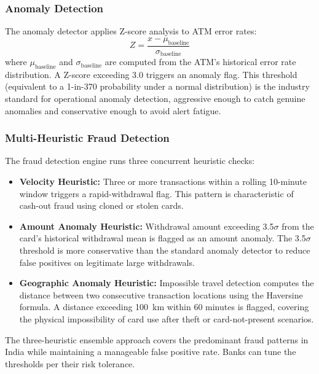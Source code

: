 \documentclass[12pt,a4paper]{article}
\begin{document}
\subsubsection{Anomaly Detection}

The anomaly detector applies Z-score analysis to ATM error rates:
\begin{equation}
  Z = \frac{x - \mu_{\text{baseline}}}{\sigma_{\text{baseline}}}
\end{equation}
where $\mu_{\text{baseline}}$ and $\sigma_{\text{baseline}}$ are computed from the ATM's
historical error rate distribution. A Z-score exceeding 3.0 triggers an anomaly flag.
This threshold (equivalent to a 1-in-370 probability under a normal distribution) is the
industry standard for operational anomaly detection, aggressive enough to catch genuine
anomalies and conservative enough to avoid alert fatigue.

\subsubsection{Multi-Heuristic Fraud Detection}

The fraud detection engine runs three concurrent heuristic checks:

\begin{itemize}
  \item \textbf{Velocity Heuristic:} Three or more transactions within a rolling 10-minute
        window triggers a rapid-withdrawal flag. This pattern is characteristic of cash-out
        fraud using cloned or stolen cards.
  \item \textbf{Amount Anomaly Heuristic:} Withdrawal amount exceeding 3.5$\sigma$ from the
        card's historical withdrawal mean is flagged as an amount anomaly. The 3.5$\sigma$
        threshold is more conservative than the standard anomaly detector to reduce false positives
        on legitimate large withdrawals.
  \item \textbf{Geographic Anomaly Heuristic:} Impossible travel detection computes the distance
        between two consecutive transaction locations using the Haversine formula. A distance
        exceeding 100~km within 60 minutes is flagged, covering the physical impossibility of
        card use after theft or card-not-present scenarios.
\end{itemize}

The three-heuristic ensemble approach covers the predominant fraud patterns in India while
maintaining a manageable false positive rate. Banks can tune the thresholds per their risk
tolerance.
\end{document}
